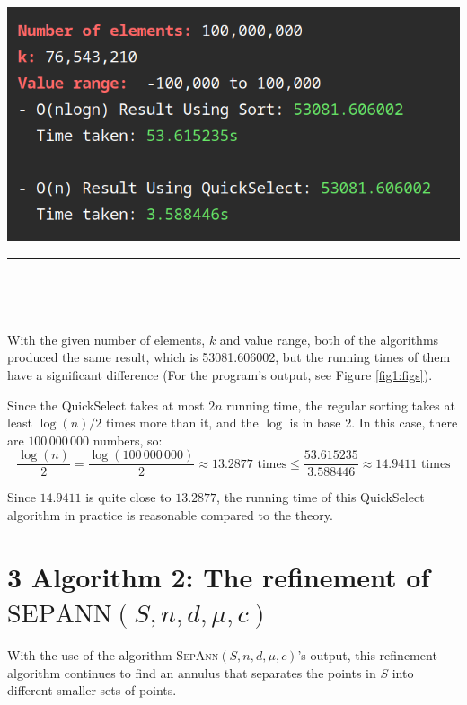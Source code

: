 \documentclass[12pt,english,]{article}
\newcommand{\pnt}[1]{{\scriptstyle#1}}
\let\origfigure\figure
\let\endorigfigure\endfigure
\renewenvironment{figure}[1][2] {
    \expandafter\origfigure\expandafter[H]
} {
    \endorigfigure
}
\begin{document}
\begin{figure}

{\centering \includegraphics[width=0.7\linewidth]{../images_&_data/kth_smallest/100m} 

}

\caption{\label{fig1:figs}The outputs of the $O(n \log n)$ algorithm using regular sorting and the $O(n)$ QuickSelect algorithm. Number of input elements is $100\,000\,000$ with $k = 76\,543\,210$.}\label{fig:unnamed-chunk-1}
\end{figure}

\hrule

~

~

With the given number of elements, \(k\) and value range, both of the
algorithms produced the same result, which is 53081.606002, but the
running times of them have a significant difference (For the program's
output, see Figure \ref{fig1:figs}).

Since the QuickSelect takes at most \(2n\) running time, the regular
sorting takes at least \(\log(n)/2\) times more than it, and the
\(\log\) is in base 2. In this case, there are \(100\,000\,000\)
numbers, so:
\[\frac{\log(n)}{2} = \frac{\log(100\,000\,000)}{2} \approx 13.2877 \text{ times} \leq \frac{53.615235}{3.588446} \approx 14.9411 \text{ times}\]

Since \(14.9411\) is quite close to \(13.2877\), the running time of
this QuickSelect algorithm in practice is reasonable compared to the
theory.

\hypertarget{section3}{%
\section{\texorpdfstring{3 \enspace Algorithm 2: The refinement of
\(\mathrm{S\pnt{EP}A\pnt{NN}}(S,n,d,\mu,c)\)}{3 Algorithm 2: The refinement of \textbackslash{}mathrm\{S\textbackslash{}pnt\{EP\}A\textbackslash{}pnt\{NN\}\}(S,n,d,\textbackslash{}mu,c)}}\label{section3}}

With the use of the algorithm \textsc{SepAnn$(S,n,d,\mu,c)$}'s output,
this refinement algorithm continues to find an annulus that separates
the points in \(S\) into different smaller sets of points.
\end{document}
